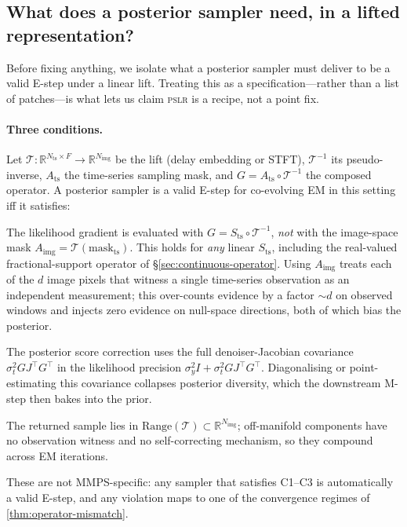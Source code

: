 \documentclass{article}
\theoremstyle{plain}
\theoremstyle{definition}
\theoremstyle{remark}
\newcommand{\tsimg}{\mathcal{T}}
\newcommand{\imgts}{\mathcal{T}^{-1}}
\newcommand{\pslr}{\textsc{pslr}}
\newcommand{\Nts}{N_{\mathrm{ts}}}
\newcommand{\Nimg}{N_{\mathrm{img}}}
\newcommand{\Ats}{A_{\mathrm{ts}}}
\newcommand{\Aimg}{A_{\mathrm{img}}}
\begin{document}
\vspace{-1mm}
\subsection{What does a posterior sampler need, in a lifted representation?}
\label{subsec:requirements}
\vspace{-1mm}

Before fixing anything, we isolate what a posterior sampler must deliver to be a valid E-step under a linear lift. Treating this as a specification---rather than a list of patches---is what lets us claim \pslr{} is a recipe, not a point fix.

\paragraph{Three conditions.}
Let $\tsimg : \mathbb{R}^{\Nts \times F} \to \mathbb{R}^{\Nimg}$ be the lift (delay embedding or STFT), $\imgts$ its pseudo-inverse, $\Ats$ the time-series sampling mask, and $G = \Ats \circ \imgts$ the composed operator. A posterior sampler is a valid E-step for co-evolving EM in this setting iff it satisfies:
\begin{description}
\setlength{\itemsep}{1pt}
\item[C1 (composed operator).] The likelihood gradient is evaluated with $G = S_{\mathrm{ts}} \circ \imgts$, \emph{not} with the image-space mask $\Aimg = \tsimg(\mathrm{mask}_{\mathrm{ts}})$. This holds for \emph{any} linear $S_{\mathrm{ts}}$, including the real-valued fractional-support operator of \S\ref{sec:continuous-operator}. Using $\Aimg$ treats each of the $d$ image pixels that witness a single time-series observation as an independent measurement; this over-counts evidence by a factor $\sim d$ on observed windows and injects zero evidence on null-space directions, both of which bias the posterior.
\item[C2 (Tweedie covariance preservation).] The posterior score correction uses the full denoiser-Jacobian covariance $\sigma_t^2 G J^\top G^\top$ in the likelihood precision $\sigma_y^2 I + \sigma_t^2 G J^\top G^\top$. Diagonalising or point-estimating this covariance collapses posterior diversity, which the downstream M-step then bakes into the prior.
\item[C3 (manifold consistency).] The returned sample lies in $\mathrm{Range}(\tsimg) \subset \mathbb{R}^{\Nimg}$; off-manifold components have no observation witness and no self-correcting mechanism, so they compound across EM iterations.
\end{description}
These are not MMPS-specific: any sampler that satisfies C1--C3 is automatically a valid E-step, and any violation maps to one of the convergence regimes of \cref{thm:operator-mismatch}.
\end{document}
